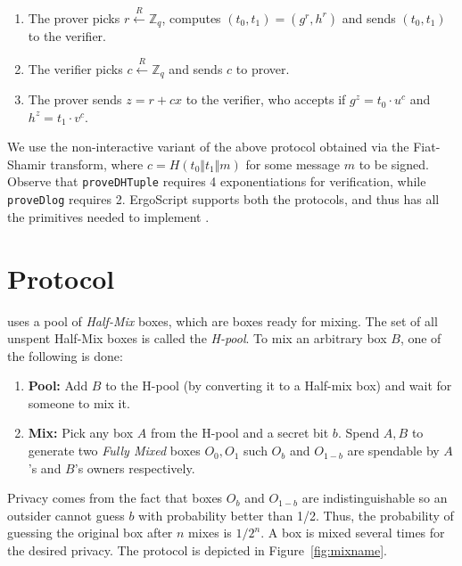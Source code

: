 \documentclass[11pt]{article}
\newcommand{\langname}{ErgoScript\xspace}
\begin{document}
\begin{enumerate}
	\item The prover picks $r \stackrel{R}{\leftarrow} \mathbb{Z}_q$, computes $(t_0, t_1) = ({g}^r, {h}^r)$ and sends $(t_0, t_1)$ to the verifier.
	\item The verifier picks $c \stackrel{R}{\leftarrow} \mathbb{Z}_q$ and sends $c$ to prover.
	\item The prover sends $z = r + cx$ to the verifier, who accepts if ${g}^z = {t_0}\cdot {u}^c$ and $h^z=t_1\cdot v^c$.
\end{enumerate}

We use the non-interactive variant of the above protocol obtained via the Fiat-Shamir transform, where $c = H(t_0 \Vert t_1\Vert m)$ for some message $m$ to be signed.  Observe that \texttt{proveDHTuple} requires 4 exponentiations for verification, while \texttt{proveDlog} requires 2. \langname supports both the protocols, and thus has all the primitives needed to implement \algname.

\section{\algname Protocol}

\algname uses a pool of {\em Half-Mix} boxes, which are boxes ready for mixing. The set of all unspent Half-Mix boxes is called the {\em H-pool}. To mix an arbitrary box $B$, one of the following is done:
\begin{enumerate}
	\item \textbf{Pool:} Add $B$ to the H-pool (by converting it to a Half-mix box) and wait for someone to mix it.
	\item \textbf{Mix:} Pick any box $A$ from the H-pool and a secret bit $b$. Spend $A, B$ to generate two {\em Fully Mixed} boxes $O_0, O_1$ such $O_b$ and $O_{1-b}$ are spendable by $A$'s and $B$'s owners respectively.
\end{enumerate}

Privacy comes from the fact that boxes $O_b$ and $O_{1-b}$ are indistinguishable so an outsider cannot guess $b$ with probability better than 1/2. Thus, the probability of guessing the original box after $n$ mixes is $1/2^n$. A box is mixed several times for the desired privacy. The protocol is depicted in Figure~\ref{fig:mixname}. 
\end{document}
